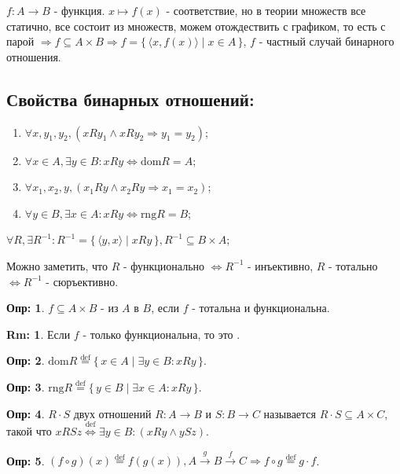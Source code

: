 \documentclass[12pt]{article}
\theoremstyle{definition}
\newtheorem{defn}{Опр:}
\newtheorem{rem}{Rm:}
\begin{document}
$f\colon A \rightarrow B$ - функция. $x \mapsto f(x)$ - соответствие, но в теории множеств все статично, все состоит из множеств, можем отождествить с графиком, то есть с парой $\Rightarrow f \subseteq A \times B \Rightarrow f = \{\,\langle x,f(x) \rangle \mid x \in A\,\}$, $f$ - частный случай бинарного отношения.

\subsection*{Свойства бинарных отношений:}
\begin{enumerate}[label={(\arabic*)}]
	\item {} $\forall x, y_1, y_2, (xRy_1 \wedge xRy_2 \Rightarrow y_1 = y_2)$;
	\item {} $\forall x \in A, \exists y \in B \colon xRy \Leftrightarrow \text{dom}R = A$;
	\item {} $\forall x_1, x_2, y, (x_1Ry \wedge x_2Ry \Rightarrow x_1 = x_2)$;
	\item {} $\forall y \in B, \exists x \in A \colon xRy \Leftrightarrow \text{rng}R = B$;
\end{enumerate}

$\forall R, \exists R^{-1}\colon R^{-1} =\{\,\langle y,x \rangle \mid xRy \,\}, R^{-1} \subseteq B\times A$;

Можно заметить, что $R$ - функционально $\Leftrightarrow R^{-1}$ - инъективно, $R$ - тотально $\Leftrightarrow R^{-1}$ - сюръективно.

\begin{defn}
	$f \subseteq A\times B$ -  из $A$ в $B$, если $f$ - тотальна и функциональна.	
\end{defn}

\begin{rem}
Если $f$ - только функциональна, то это .
\end{rem}

\begin{defn}
	 $\text{dom}R \overset{\text{def}}{=} \{\, x\in A \mid \exists y \in B \colon xRy\,\}$.
\end{defn}

\begin{defn}
	 $\text{rng}R \overset{\text{def}}{=} \{\, y\in B \mid \exists x \in A \colon xRy\,\}$.
\end{defn}

\begin{defn}
	 $R\cdot S$ двух отношений $R \colon A \rightarrow B$ и $S \colon B \rightarrow C$ называется $R\cdot S \subseteq A\times C$, такой что $xRSz \overset{\text{def}}{\Leftrightarrow} \exists y \in B \colon (xRy \wedge ySz)$.
\end{defn}

\begin{defn}
	$(f \circ g)(x) \overset{\text{def}}{=} f(g(x)), A \overset{g}{\rightarrow} B \overset{f}{\rightarrow} C \Rightarrow f\circ g \overset{\text{def}}{=} g \cdot f$.
\end{defn}
\end{document}
